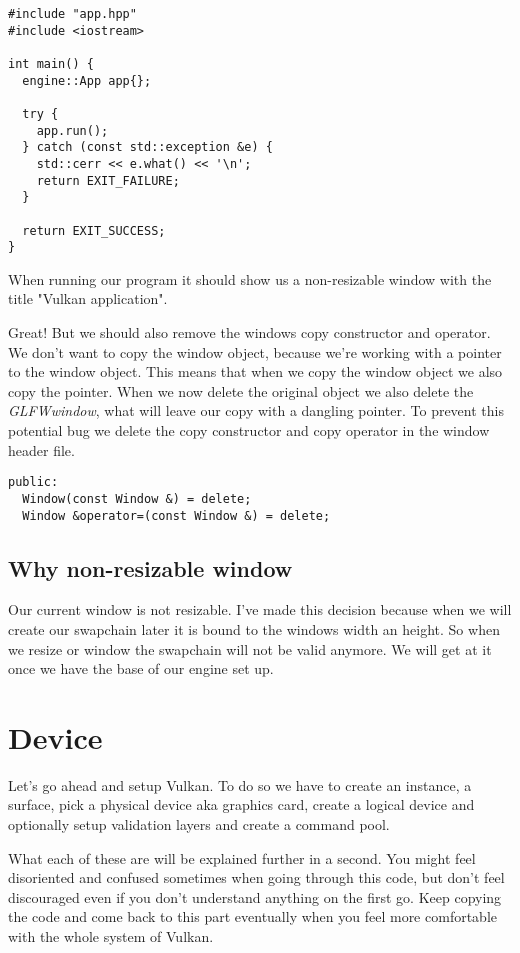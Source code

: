 \documentclass[12pt]{report} \usepackage{preamble}
\begin{document}
\begin{lstlisting}[Language=C++]
#include "app.hpp"
#include <iostream>

int main() {
  engine::App app{};

  try {
    app.run();
  } catch (const std::exception &e) {
    std::cerr << e.what() << '\n';
    return EXIT_FAILURE;
  }

  return EXIT_SUCCESS;
}
\end{lstlisting}

When running our program it should show us a non-resizable window with the title "Vulkan application".

Great! But we should also remove the windows copy constructor and operator. We don't want to copy the window object,
because we're working with a pointer to the window object. This means that when we copy the window object
we also copy the pointer. When we now delete the original object we also delete the \textit{GLFWwindow}, what
will leave our copy with a dangling pointer. To prevent this potential bug we delete
the copy constructor and copy operator in the window header file.

\begin{lstlisting}
public:
  Window(const Window &) = delete;
  Window &operator=(const Window &) = delete;
\end{lstlisting}

\subsection{Why non-resizable window}

Our current window is not resizable. I've made this decision because when we will
create our swapchain later it is bound to the windows width an height. So when we
resize or window the swapchain will not be valid anymore. We will get at it once
we have the base of our engine set up.

\section{Device}

Let's go ahead and setup Vulkan. To do so we have to create an instance,
a surface, pick a physical device aka graphics card, create a logical device
and optionally setup validation layers and create a command pool.

What each of these are will be explained further in a second. You might
feel disoriented and confused sometimes when going through this code, but
don't feel discouraged even if you don't understand anything on the first go.
Keep copying the code and come back to this part eventually when you feel more
comfortable with the whole system of Vulkan.
\end{document}
